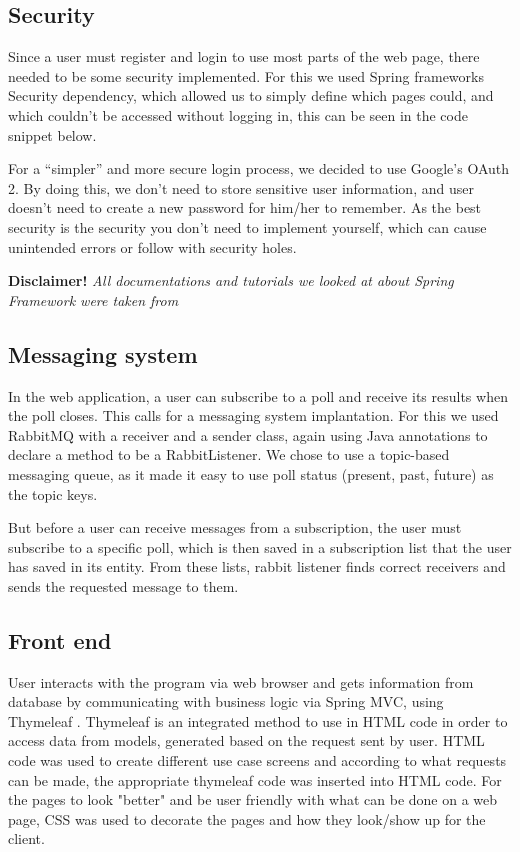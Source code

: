 \subsection{Security}\label{sub:security}
Since a user must register and login to use most parts of the web page, there needed to be some security implemented. For this we used Spring frameworks Security dependency, which allowed us to simply define which pages could, and which couldn't be accessed without logging in, this can be seen in the code snippet below.

For a “simpler” and more secure login process, we decided to use Google's OAuth 2. By doing this, we don't need to store sensitive user information, and user doesn't need to create a new password for him/her to remember. As the best security is the security you don't need to implement yourself, which can cause unintended errors or follow with security holes.



{\footnotesize\textbf{Disclaimer!}\textit{ All documentations and tutorials we looked at about Spring Framework were taken from \cite{spring_Framework}}}


\subsection{Messaging system}\label{sub:messaging}
In the web application, a user can subscribe to a poll and receive its results when the poll closes. This calls for a messaging system implantation. For this we used RabbitMQ\cite{rabbitmq} with a receiver and a sender class, again using Java annotations to declare a method to be a RabbitListener. We chose to use a topic-based messaging queue, as it made it easy to use poll status (present, past, future) as the topic keys.

But before a user can receive messages from a subscription, the user must subscribe to a specific poll, which is then saved in a subscription list that the user has saved in its entity. From these lists, rabbit listener finds correct receivers and sends the requested message to them. 

\subsection{Front end}\label{sub:frontend}
User interacts with the program via web browser and gets information from database by communicating with business logic via Spring MVC, using Thymeleaf \cite{thymleaf}. Thymeleaf is an integrated method to use in HTML code in order to access data from models, generated based on the request sent by user. HTML code was used to create different use case screens and according to what requests can be made, the appropriate thymeleaf code was inserted into HTML code. For the pages to look "better" and be user friendly with what can be done on a web page, CSS was used to decorate the pages and how they look/show up for the client.
